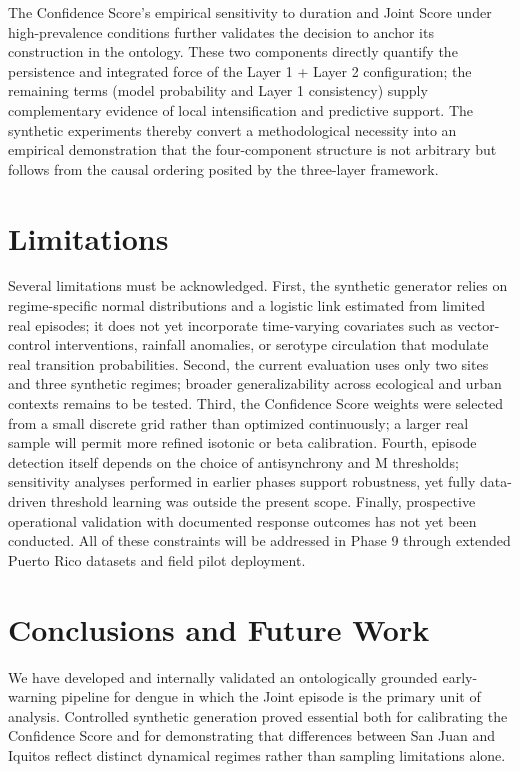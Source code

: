 \documentclass[11pt,a4paper]{article}
\begin{document}
The Confidence Score's empirical sensitivity to duration and Joint Score under high-prevalence conditions further validates the decision to anchor its construction in the ontology. These two components directly quantify the persistence and integrated force of the Layer 1 + Layer 2 configuration; the remaining terms (model probability and Layer 1 consistency) supply complementary evidence of local intensification and predictive support. The synthetic experiments thereby convert a methodological necessity into an empirical demonstration that the four-component structure is not arbitrary but follows from the causal ordering posited by the three-layer framework.

\section{Limitations}

Several limitations must be acknowledged. First, the synthetic generator relies on regime-specific normal distributions and a logistic link estimated from limited real episodes; it does not yet incorporate time-varying covariates such as vector-control interventions, rainfall anomalies, or serotype circulation that modulate real transition probabilities. Second, the current evaluation uses only two sites and three synthetic regimes; broader generalizability across ecological and urban contexts remains to be tested. Third, the Confidence Score weights were selected from a small discrete grid rather than optimized continuously; a larger real sample will permit more refined isotonic or beta calibration. Fourth, episode detection itself depends on the choice of antisynchrony and M thresholds; sensitivity analyses performed in earlier phases support robustness, yet fully data-driven threshold learning was outside the present scope. Finally, prospective operational validation with documented response outcomes has not yet been conducted. All of these constraints will be addressed in Phase 9 through extended Puerto Rico datasets and field pilot deployment.

\section{Conclusions and Future Work}

We have developed and internally validated an ontologically grounded early-warning pipeline for dengue in which the Joint episode is the primary unit of analysis. Controlled synthetic generation proved essential both for calibrating the Confidence Score and for demonstrating that differences between San Juan and Iquitos reflect distinct dynamical regimes rather than sampling limitations alone.
\end{document}
